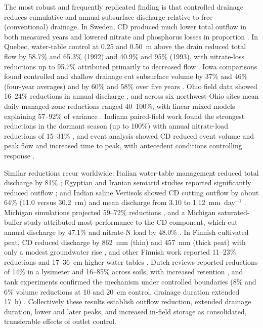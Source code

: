 \documentclass[11pt]{article}
\begin{document}
The most robust and frequently replicated finding is that controlled drainage
reduces cumulative and annual subsurface discharge relative to free
(conventional) drainage. In Sweden, CD produced much lower total outflow in both
measured years and lowered nitrate and phosphorus losses in proportion
\parencite{Wesström2001,Wesström2007}. In Quebec, water-table control at 0.25
and 0.50~m above the drain reduced total flow by 58.7\% and 65.3\% (1992) and
40.9\% and 95\% (1993), with nitrate-loss reductions up to 95.7\% attributed
primarily to decreased flow \parencite{Lalonde1996}. Iowa comparisons found
controlled and shallow drainage cut subsurface volume by 37\% and 46\%
(four-year averages) and by 60\% and 58\% over five years
\parencite{Helmers2012,Schott2017}. Ohio field data showed 16--24\% reductions
in annual discharge \parencite{Pease2017}, and across six northwest-Ohio sites
mean daily managed-zone reductions ranged 40--100\%, with linear mixed models
explaining 57--92\% of variance \parencite{Gunn2015}. Indiana paired-field work
found the strongest reductions in the dormant season (up to 100\%) with annual
nitrate-load reductions of 15--31\% \parencite{Adeuya2012}, and event analysis
showed CD reduced event volume and peak flow and increased time to peak, with
antecedent conditions controlling response \parencite{Lahdou2019}.

Similar reductions recur worldwide: Italian water-table management reduced total
discharge by 81\% \parencite{Tolomio2018}; Egyptian and Iranian semiarid studies
reported significantly reduced outflow \parencite{Wahba2001,Jouni2018}; and
Indian saline Vertisols showed CD cutting outflow by about 64\% (11.0 versus
30.2~cm) and mean discharge from 3.10 to 1.12~mm~day$^{-1}$
\parencite{Karegoudar2019}. Michigan simulations projected 59--72\% reductions
\parencite{BinShokrana2023}, and a Michigan saturated-buffer study attributed
most performance to the CD component, which cut annual discharge by 47.1\% and
nitrate-N load by 48.0\% \parencite{Ghane2025}. In Finnish cultivated peat, CD
reduced discharge by 862~mm (thin) and 457~mm (thick peat) with only a modest
groundwater rise \parencite{Tähtikarhu2025}, and other Finnish work reported
11--23\% reductions and 17--36~cm higher water tables \parencite{Salla2022}.
Dutch reviews reported reductions of 14\% in a lysimeter and 16--85\% across
soils, with increased retention \parencite{deWit2022}, and tank experiments
confirmed the mechanism under controlled boundaries (8\% and 6\% volume
reductions at 10 and 20~cm control, drainage duration extended 17~h)
\parencite{Zheng2025}. Collectively these results establish outflow reduction,
extended drainage duration, lower and later peaks, and increased in-field
storage as consolidated, transferable effects of outlet control.
\end{document}
